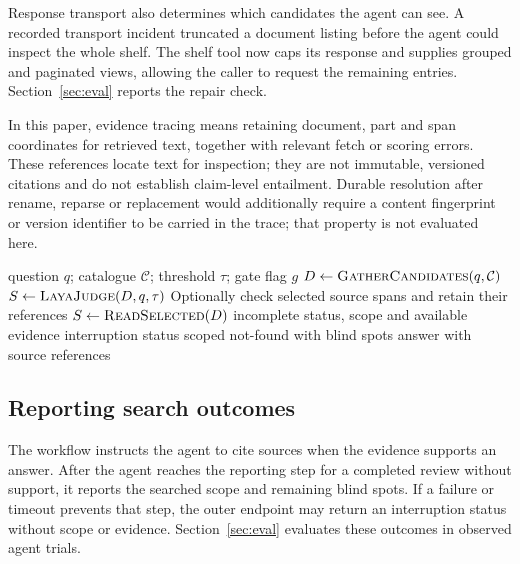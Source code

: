 Response transport also determines which candidates the agent can see.
A recorded transport incident truncated a document listing before the
agent could inspect the whole shelf. The shelf tool now caps its response and
supplies grouped and paginated views, allowing the caller to request the
remaining entries. Section~\ref{sec:eval} reports the repair check.

In this paper, evidence tracing means retaining document, part and span
coordinates for retrieved text, together with relevant fetch or scoring
errors. These references locate text for inspection; they are not immutable,
versioned citations and do not establish claim-level entailment. Durable
resolution after rename, reparse or replacement would additionally require a
content fingerprint or version identifier to be carried in the trace; that
property is not evaluated here.

\begin{algorithm}[tbp]
\caption{Tiered access with optional evidence gate}
\label{alg:tiered}
\begin{algorithmic}[1]
\Require question $q$; catalogue $\mathcal{C}$; threshold $\tau$; gate flag $g$
\State $D \gets \textsc{GatherCandidates}(q,\mathcal{C})$ 
  \State $S \gets \textsc{LayaJudge}(D,q,\tau)$ 
  \State Optionally check selected source spans and retain their references
\Else
  \State $S \gets \textsc{ReadSelected}(D)$
\EndIf
{}
  \State \Return incomplete status, scope and available evidence
  \State \Return interruption status
  \State \Return scoped not-found with blind spots
\Else
  \State \Return answer with source references
\EndIf
\end{algorithmic}
\end{algorithm}

\subsection{Reporting search outcomes}
The workflow instructs the agent to cite sources when the evidence supports
an answer. After the agent reaches the reporting step for a completed review
without support, it reports the searched scope and remaining blind spots. If a
failure or timeout prevents that step, the outer endpoint may return an
interruption status without scope or evidence. Section~\ref{sec:eval}
evaluates these outcomes in observed agent trials.
